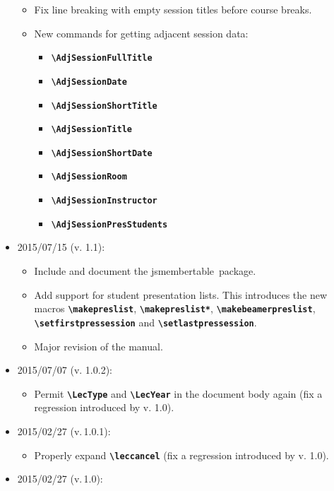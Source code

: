 \documentclass[english]{article}
\newcommand*\jmacro[1]{\textbf{\texttt{#1}}}
\newcommand*\jcsmacro[1]{\jmacro{\textbackslash{#1}}}
\newcommand*\jsmt{\textsf{jsmembertable}}
\begin{document}
\begin{itemize}
    \begin{itemize}	
	\item Fix line breaking with empty session titles before course breaks. 
	\item New commands for getting adjacent session data:
	   \begin{itemize}	
		  \item \jcsmacro{AdjSessionFullTitle}
		  \item \jcsmacro{AdjSessionDate}
		  \item \jcsmacro{AdjSessionShortTitle}
		  \item \jcsmacro{AdjSessionTitle}
		  \item \jcsmacro{AdjSessionShortDate}
		  \item \jcsmacro{AdjSessionRoom}
		  \item \jcsmacro{AdjSessionInstructor}\enlargethispage{\baselineskip}
		  \item \jcsmacro{AdjSessionPresStudents}
	  \end{itemize}
    \end{itemize}
\item 2015/07/15 (v. 1.1):
     \begin{itemize}
       \item Include and document the \jsmt\ package.
       \item Add support for student presentation lists. This introduces the new macros
             \jcsmacro{makepreslist}, \jcsmacro{makepreslist*},
             \jcsmacro{makebeamerpreslist}, \jcsmacro{setfirstpressession} and
             \jcsmacro{setlastpressession}.
       \item Major revision of the manual.
     \end{itemize}
\item 2015/07/07 (v. 1.0.2):
     \begin{itemize}
       \item Permit \jcsmacro{LecType} and \jcsmacro{LecYear} in the document body again
             (fix a regression introduced by v. 1.0).
     \end{itemize}
\item 2015/02/27 (v.\,1.0.1):
     \begin{itemize}
       \item Properly expand \jcsmacro{leccancel}
             (fix a regression introduced by v. 1.0).
     \end{itemize}
\item 2015/02/27 (v.\,1.0):
     \begin{itemize}

\end{itemize}
\end{itemize}
\end{document}
